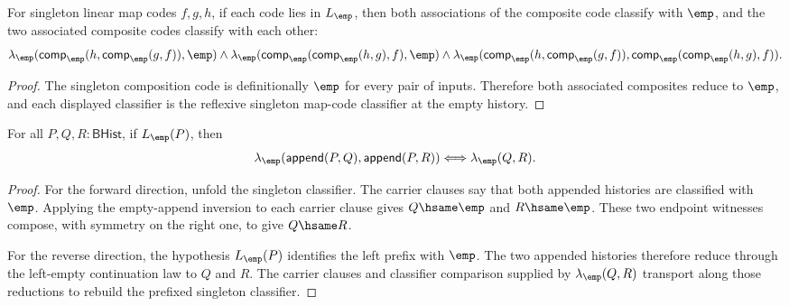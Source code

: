 \begin{theorem}
\label{thm:linearmap-singleton-comp-assoc-empty-classifier}
For singleton linear map codes $f,g,h$, if each code lies in
$L_{\emp}$, then both associations of the composite code classify with
$\emp$, and the two associated composite codes classify with each other:
$$
\lambda_{\emp}(\mathsf{comp}_{\emp}(h,\mathsf{comp}_{\emp}(g,f)),\emp)
\land
\lambda_{\emp}(\mathsf{comp}_{\emp}(\mathsf{comp}_{\emp}(h,g),f),\emp)
\land
\lambda_{\emp}(\mathsf{comp}_{\emp}(h,\mathsf{comp}_{\emp}(g,f)),
  \mathsf{comp}_{\emp}(\mathsf{comp}_{\emp}(h,g),f)).
$$
\end{theorem}
\begin{proof}
The singleton composition code is definitionally $\emp$ for every pair of
inputs. Therefore both associated composites reduce to $\emp$, and each
displayed classifier is the reflexive singleton map-code classifier at the
empty history.
\end{proof}

\begin{theorem}
\label{thm:singleton-linearmap-classifier-append-left-cancel}
For all $P,Q,R:\mathsf{BHist}$, if $L_{\emp}(P)$, then
$$
\lambda_{\emp}(\mathsf{append}(P,Q),\mathsf{append}(P,R))
\Longleftrightarrow
\lambda_{\emp}(Q,R).
$$
\end{theorem}
\begin{proof}
For the forward direction, unfold the singleton classifier. The carrier
clauses say that both appended histories are classified with $\emp$.
Applying the empty-append inversion to each carrier clause gives
$Q\hsame\emp$ and $R\hsame\emp$. These two endpoint witnesses compose, with
symmetry on the right one, to give $Q\hsame R$.

For the reverse direction, the hypothesis $L_{\emp}(P)$ identifies the left
prefix with $\emp$. The two appended histories therefore reduce through the
left-empty continuation law to $Q$ and $R$. The carrier clauses and classifier
comparison supplied by $\lambda_{\emp}(Q,R)$ transport along those reductions
to rebuild the prefixed singleton classifier.
\end{proof}

